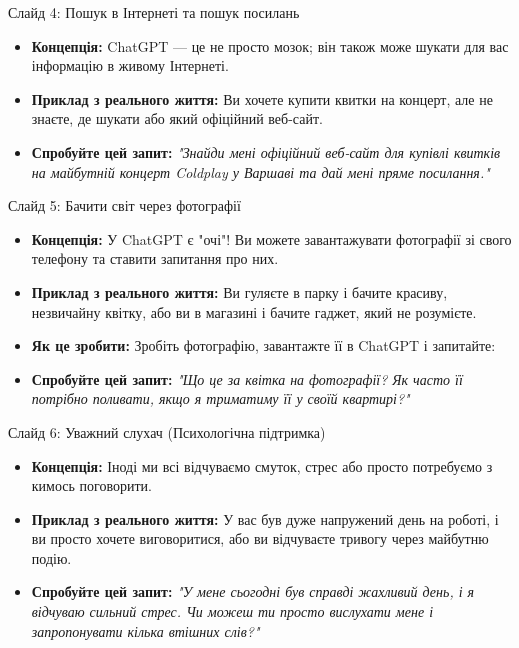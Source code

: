 \documentclass[aspectratio=169]{beamer}
\begin{document}
\begin{frame}{Слайд 4: Пошук в Інтернеті та пошук посилань}
    \begin{itemize}
        \item \textbf{Концепція:} ChatGPT — це не просто мозок; він також може шукати для вас інформацію в живому Інтернеті.
        \item \textbf{Приклад з реального життя:} Ви хочете купити квитки на концерт, але не знаєте, де шукати або який офіційний веб-сайт.
        \item \textbf{Спробуйте цей запит:} \textit{"Знайди мені офіційний веб-сайт для купівлі квитків на майбутній концерт Coldplay у Варшаві та дай мені пряме посилання."}
    \end{itemize}
\end{frame}

\begin{frame}{Слайд 5: Бачити світ через фотографії}
    \begin{itemize}
        \item \textbf{Концепція:} У ChatGPT є "очі"! Ви можете завантажувати фотографії зі свого телефону та ставити запитання про них.
        \item \textbf{Приклад з реального життя:} Ви гуляєте в парку і бачите красиву, незвичайну квітку, або ви в магазині і бачите гаджет, який не розумієте.
        \item \textbf{Як це зробити:} Зробіть фотографію, завантажте її в ChatGPT і запитайте:
        \item \textbf{Спробуйте цей запит:} \textit{"Що це за квітка на фотографії? Як часто її потрібно поливати, якщо я триматиму її у своїй квартирі?"}
    \end{itemize}
\end{frame}

\begin{frame}{Слайд 6: Уважний слухач (Психологічна підтримка)}
    \begin{itemize}
        \item \textbf{Концепція:} Іноді ми всі відчуваємо смуток, стрес або просто потребуємо з кимось поговорити.
        \item \textbf{Приклад з реального життя:} У вас був дуже напружений день на роботі, і ви просто хочете виговоритися, або ви відчуваєте тривогу через майбутню подію.
        \item \textbf{Спробуйте цей запит:} \textit{"У мене сьогодні був справді жахливий день, і я відчуваю сильний стрес. Чи можеш ти просто вислухати мене і запропонувати кілька втішних слів?"}
    \end{itemize}
\end{frame}
\end{document}
